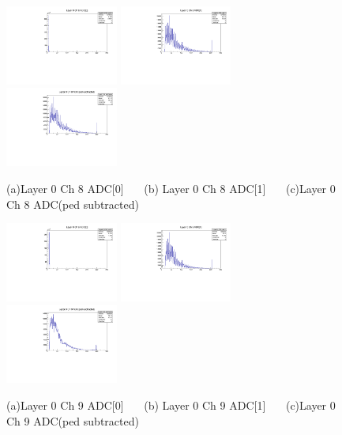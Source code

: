 \documentclass[a4paper,11pt]{article}
\theoremstyle{mytheor}
\begin{document}
\begin{figure}[H] 
\vspace*{-0.3cm} 
\includegraphics[width=0.33\textwidth,scale=0.5,trim=0 0 0 0,clip]{plotsdir/file0_test-Layer0_Ch8_adc0-1.pdf} 
\includegraphics[width=0.33\textwidth,scale=0.5,trim=0 0 0 0,clip]{plotsdir/file0_test-Layer0_Ch8_adc1-1.pdf} 
\includegraphics[width=0.33\textwidth,scale=0.5,trim=0 0 0 0,clip]{plotsdir/file0_test-Layer0_Ch8_adcPedsub-1.pdf} 
\caption{(a)Layer 0 Ch 8 ADC[0] ~~~(b) Layer 0 Ch 8 ADC[1] ~~~(c)Layer 0 Ch 8 ADC(ped subtracted) } 
\end{figure} 
\begin{figure}[H] 
\vspace*{-0.3cm} 
\includegraphics[width=0.33\textwidth,scale=0.5,trim=0 0 0 0,clip]{plotsdir/file0_test-Layer0_Ch9_adc0-1.pdf} 
\includegraphics[width=0.33\textwidth,scale=0.5,trim=0 0 0 0,clip]{plotsdir/file0_test-Layer0_Ch9_adc1-1.pdf} 
\includegraphics[width=0.33\textwidth,scale=0.5,trim=0 0 0 0,clip]{plotsdir/file0_test-Layer0_Ch9_adcPedsub-1.pdf} 
\caption{(a)Layer 0 Ch 9 ADC[0] ~~~(b) Layer 0 Ch 9 ADC[1] ~~~(c)Layer 0 Ch 9 ADC(ped subtracted) } 
\end{figure} 
\end{document}
